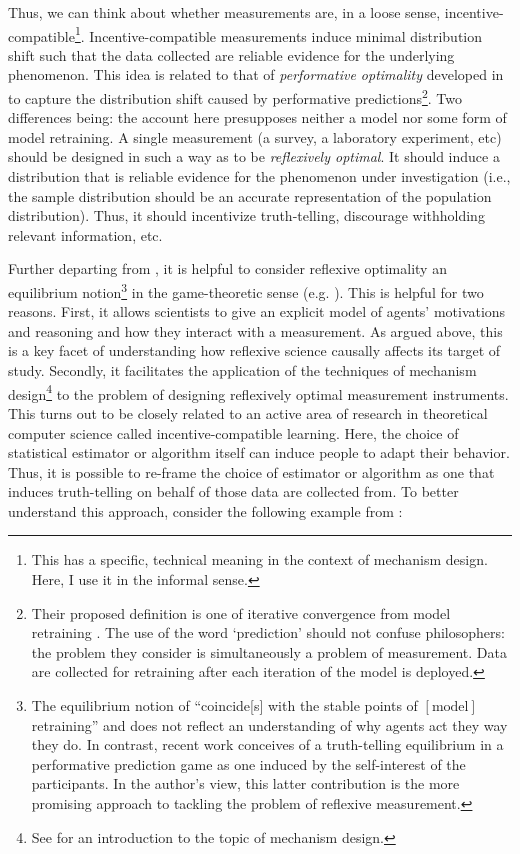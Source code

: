 Thus, we can think about whether measurements are, in a loose sense, incentive-compatible\footnote{This has a specific, technical meaning in the context of mechanism design. Here, I use it in the informal sense.}. Incentive-compatible measurements induce minimal distribution shift such that the data collected are reliable evidence for the underlying phenomenon. This idea is related to that of \textit{performative optimality} developed in \autocite{perdomo2020} to capture the distribution shift caused by performative predictions\footnote{Their proposed definition is one of iterative convergence from model retraining \autocite[Definition 2.3]{perdomo2020}. The use of the word `prediction' should not confuse philosophers: the problem they consider is simultaneously a problem of measurement. Data are collected for retraining after each iteration of the model is deployed.}. Two differences being: the account here presupposes neither a model nor some form of model retraining. A single measurement (a survey, a laboratory experiment, etc) should be designed in such a way as to be \textit{reflexively optimal}. It should induce a distribution that is reliable evidence for the phenomenon under investigation (i.e., the sample distribution should be an accurate representation of the population distribution). Thus, it should incentivize truth-telling, discourage withholding relevant information, etc.

Further departing from \autocite{perdomo2020}, it is helpful to consider reflexive optimality an equilibrium notion\footnote{The equilibrium notion of \autocite[p1]{perdomo2020} ``coincide[s] with the stable points of $[\text{model}]$ retraining'' and does not reflect an understanding of why agents act they way they do. In contrast, recent work \autocite{oesterheld23} conceives of a truth-telling equilibrium in a performative prediction game as one induced by the self-interest of the participants. In the author's view, this latter contribution is the more promising approach to tackling the problem of reflexive measurement.} in the game-theoretic sense (e.g. \cite{nash1950}). This is helpful for two reasons. First, it allows scientists to give an explicit model of agents' motivations and reasoning and how they interact with a measurement. As argued above, this is a key facet of understanding how reflexive science causally affects its target of study. Secondly, it facilitates the application of the techniques of mechanism design\footnote{See \autocite{borgers2015} for an introduction to the topic of mechanism design.} to the problem of designing reflexively optimal measurement instruments. This turns out to be closely related to an active area of research in theoretical computer science called incentive-compatible learning. Here, the choice of statistical estimator or algorithm itself can induce people to adapt their behavior. Thus, it is possible to re-frame the choice of estimator or algorithm as one that induces truth-telling on behalf of those data are collected from. To better understand this approach, consider the following example from \autocite{caragiannis2016}:

